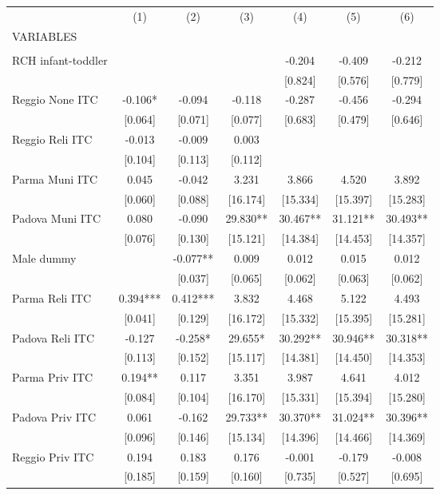 \begin{tabular}{lcccccc} \hline
 & (1) & (2) & (3) & (4) & (5) & (6) \\
VARIABLES &  &  &  &  &  &  \\ \hline
 &  &  &  &  &  &  \\
RCH infant-toddler &  &  &  & -0.204 & -0.409 & -0.212 \\
 &  &  &  & [0.824] & [0.576] & [0.779] \\
Reggio None ITC & -0.106* & -0.094 & -0.118 & -0.287 & -0.456 & -0.294 \\
 & [0.064] & [0.071] & [0.077] & [0.683] & [0.479] & [0.646] \\
Reggio Reli ITC & -0.013 & -0.009 & 0.003 &  &  &  \\
 & [0.104] & [0.113] & [0.112] &  &  &  \\
Parma Muni ITC & 0.045 & -0.042 & 3.231 & 3.866 & 4.520 & 3.892 \\
 & [0.060] & [0.088] & [16.174] & [15.334] & [15.397] & [15.283] \\
Padova Muni ITC & 0.080 & -0.090 & 29.830** & 30.467** & 31.121** & 30.493** \\
 & [0.076] & [0.130] & [15.121] & [14.384] & [14.453] & [14.357] \\
Male dummy &  & -0.077** & 0.009 & 0.012 & 0.015 & 0.012 \\
 &  & [0.037] & [0.065] & [0.062] & [0.063] & [0.062] \\
Parma Reli ITC & 0.394*** & 0.412*** & 3.832 & 4.468 & 5.122 & 4.493 \\
 & [0.041] & [0.129] & [16.172] & [15.332] & [15.395] & [15.281] \\
Padova Reli ITC & -0.127 & -0.258* & 29.655* & 30.292** & 30.946** & 30.318** \\
 & [0.113] & [0.152] & [15.117] & [14.381] & [14.450] & [14.353] \\
Parma Priv ITC & 0.194** & 0.117 & 3.351 & 3.987 & 4.641 & 4.012 \\
 & [0.084] & [0.104] & [16.170] & [15.331] & [15.394] & [15.280] \\
Padova Priv ITC & 0.061 & -0.162 & 29.733** & 30.370** & 31.024** & 30.396** \\
 & [0.096] & [0.146] & [15.134] & [14.396] & [14.466] & [14.369] \\
Reggio Priv ITC & 0.194 & 0.183 & 0.176 & -0.001 & -0.179 & -0.008 \\
 & [0.185] & [0.159] & [0.160] & [0.735] & [0.527] & [0.695] \\

\end{tabular}
